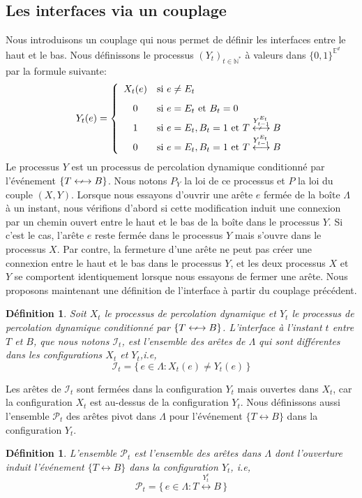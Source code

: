 \documentclass[titlepage,a4paper,12pt]{article}
\newcounter{def}
\newcounter{th}
\newcounter{propo}
\newtheorem{defi}[def]{Définition}
\begin{document}
\subsection{Les interfaces via un couplage}
Nous introduisons un couplage qui nous permet de définir les interfaces entre le haut et le bas. 
Nous définissons le processus $(Y_t)_{t\in\mathbb{N}^*}$ à valeurs dans $\{0,1\}^{\mathbb{E}^d}$ par la formule suivante:
$$ Y_t(e) = \left\lbrace \begin{array}{cl}
X_t(e) & \text{si }e \neq E_t\\
0 &\text{si } e = E_t\text{ et } B_t = 0\phantom{T\overset{Y_{t-1}^{E_t}}{\longarrownot\longleftrightarrow} B}\\
1 & \text{si } e=E_t, B_t = 1 \text{ et } T\overset{Y_{t-1}^{E_t}}{\longarrownot\longleftrightarrow} B\\
0 & \text{si } e=E_t, B_t = 1 \text{ et } T\overset{Y_{t-1}^{E_t}}{\longleftrightarrow} B
\end{array} \right.
$$
Le processus $Y$ est un processus de percolation dynamique conditionné par l'événement $\{T\longarrownot\longleftrightarrow B\}$. Nous notons $P_Y$ la loi de ce processus et $P$ la loi du couple $(X,Y)$. Lorsque nous essayons d'ouvrir une arête $e$ fermée de la boîte $\Lambda$ à un instant, nous vérifions d'abord si cette modification induit une connexion par un chemin ouvert entre le haut et le bas de la boîte dans le processus $Y$. Si c'est le cas, l'arête $e$ reste fermée dans le processus $Y$ mais s'ouvre dans le processus $X$. Par contre, la fermeture d'une arête ne peut pas créer une connexion entre le haut et le bas dans le processus $Y$, et les deux processus $X$ et $Y$ se comportent identiquement lorsque nous essayons de fermer une arête.
Nous proposons maintenant une définition de l'interface à partir du couplage précédent.
\begin{defi} Soit $X_t$ le processus de percolation dynamique et $Y_t$ le processus de percolation dynamique conditionné par $\{T\longarrownot\longleftrightarrow B\}$. L'interface à l'instant $t$ entre $T$ et $B$, que nous notons $\mathcal{I}_t$, est l'ensemble des arêtes de $\Lambda$ qui sont différentes dans les configurations $X_t$ et $Y_t$,i.e,
$$ \mathcal{I}_t = \big\{\,e\in\Lambda : X_t(e) \neq Y_t(e)\,\big\}
$$
\end{defi}
Les arêtes de $\mathcal{I}_t$ sont fermées dans la configuration $Y_t$ mais ouvertes dans $X_t$, car la configuration $X_t$ est au-dessus de la configuration $Y_t$.
Nous définissons aussi l'ensemble $\mathcal{P}_t$ des arêtes pivot dans $\Lambda$ pour l'événement $\{T\longleftrightarrow B\}$ dans la configuration $Y_t$. 
\begin{defi} L'ensemble $\mathcal{P}_t$ est l'ensemble des arêtes dans $\Lambda$ dont l'ouverture induit l'événement $\{T\longleftrightarrow B\}$ dans la configuration $Y_t$, i.e,
$$\mathcal{P}_t = \big\{ \,e\in\Lambda : T\overset{Y_t^e}{\longleftrightarrow} B\,\big\}
$$
\end{defi}
\end{document}
